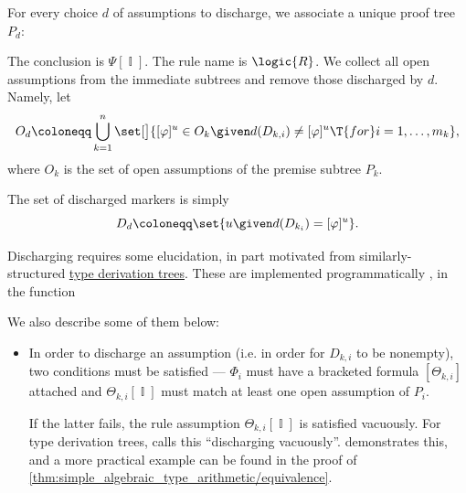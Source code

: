 \begin{definition}
\begin{thmenum}[resume=def:propositional_natural_deduction_proof_tree]
    For every choice \( d \) of assumptions to discharge, we associate a unique proof tree \( P_d \):
    \begin{thmenum}[resume=def:propositional_natural_deduction_proof_tree/application]
       The conclusion is \( \Psi[\BbbI] \).
       The rule name is \( \logic{R} \).
       We collect all open assumptions from the immediate subtrees and remove those discharged by \( d \). Namely, let
      \begin{equation*}
        O_d \coloneqq \bigcup_{k=1}^n \set[\big]{ [\varphi]^u \in O_k \given d(D_{k,i}) \neq [\varphi]^u \T{for} i=1, \ldots, m_k },
      \end{equation*}
      where \( O_k \) is the set of open assumptions of the premise subtree \( P_k \).

       The set of discharged markers is simply
      \begin{equation*}
        D_d \coloneqq \set{ u \given d(D_{k_i}) = [\varphi]^u }.
      \end{equation*}
    \end{thmenum}

    Discharging requires some elucidation, in part motivated from similarly-structured \hyperref[def:type_derivation_tree]{type derivation trees}. These are implemented programmatically \cite{notebook:code}, in the function
    \begin{CodeRefDisplay}
    \end{CodeRefDisplay}

    We also describe some of them below:
    \begin{itemize}
      \item In order to discharge an assumption (i.e. in order for \( D_{k,i} \) to be nonempty), two conditions must be satisfied  --- \( \Phi_i \) must have a bracketed formula \( [\Theta_{k,i}] \) attached and \( \Theta_{k,i}[\BbbI] \) must match at least one open assumption of \( P_i \).

      If the latter fails, the rule assumption \( \Theta_{k,i}[\BbbI] \) is satisfied vacuously. For type derivation trees, \textcite[note 2A8.1]{Hindley1997BasicSTT} calls this \enquote{discharging vacuously}.  demonstrates this, and a more practical example can be found in the proof of \cref{thm:simple_algebraic_type_arithmetic/equivalence}.


\end{itemize}
\end{thmenum}
\end{definition}
